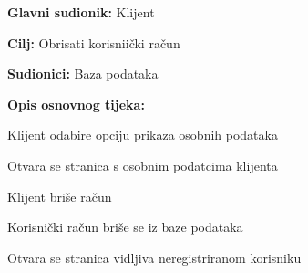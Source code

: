					\noindent {}
					\begin{packed_item}
	
						\item \textbf{Glavni sudionik: }Klijent
						\item  \textbf{Cilj:} Obrisati korisniički račun
						\item  \textbf{Sudionici:} Baza podataka
						\item  \textbf{Opis osnovnog tijeka:}
						
						\item[] \begin{packed_enum}
	
							\item Klijent odabire opciju prikaza osobnih podataka
							\item Otvara se stranica s osobnim podatcima klijenta
							\item Klijent briše račun
							\item Korisnički račun briše se iz baze podataka
							\item Otvara se stranica vidljiva neregistriranom korisniku
						\end{packed_enum}
						
					\end{packed_item}
					
